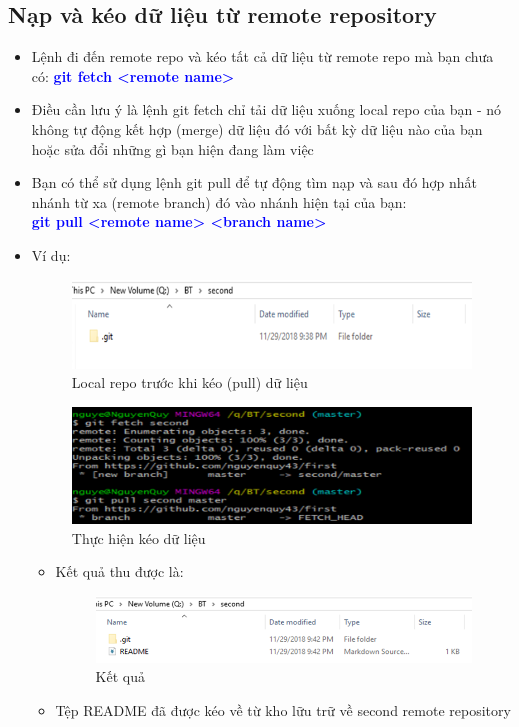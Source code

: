 \documentclass[12pt,a4paper]{report}
\begin{document}
\subsection{Nạp và kéo dữ liệu từ remote repository} 
\begin{itemize}
\item Lệnh đi đến remote repo và kéo tất cả dữ liệu từ remote repo mà bạn chưa có: \textcolor{blue}{\bf git fetch <remote name>}
\item Điều cần lưu ý là lệnh git fetch chỉ tải dữ liệu xuống  local repo của bạn - nó không tự động kết hợp (merge) dữ liệu đó với bất kỳ dữ liệu nào của bạn hoặc sửa đổi những gì bạn hiện đang làm việc
\item Bạn có thể sử dụng lệnh git pull để tự động tìm nạp và sau đó hợp nhất nhánh từ xa (remote branch) đó vào nhánh hiện tại của bạn:\\ \textcolor{blue}{\bf git pull <remote name> <branch name>}
\item Ví dụ: 
	
	\begin{figure}[!ht]
	\centering
	\includegraphics[width=0.8\linewidth]{screenshot035}
\caption{Local repo trước khi kéo (pull) dữ liệu}
	\label{fig:screenshot035}
	\end{figure}

\begin{figure}[!ht]
	\centering	
	\includegraphics[width=0.8\linewidth]{screenshot036}
\caption{Thực hiện kéo dữ liệu}
	\label{fig:screenshot036}
\end{figure}

\begin{itemize}
\item Kết quả thu được là: 

\begin{figure}[!ht]
	\centering
	\includegraphics[width=0.8\linewidth]{screenshot037}
\caption{Kết quả}
	\label{fig:screenshot037}
\end{figure}

\item Tệp README đã được kéo về từ kho lữu trữ về second remote repository
\end{itemize}
\end{itemize}
\end{document}
